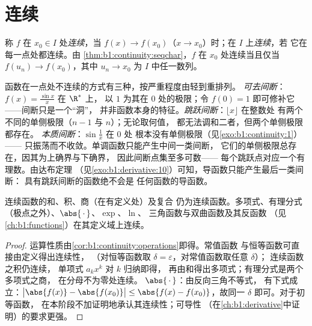 \section{连续}

\begin{definition}\label{def:b1:continuity:continuous}
称 $f$ 在 $x_0 \in I$ 处\emph{连续}，当 $f(x)
\to f(x_0)$（$x \to x_0$）时；在 $I$ 上\emph{连续}，若
它在每一点处都连续。由
\cref{thm:b1:continuity:seqchar}，$f$ 在 $x_0$ 处连续当且仅当
$f(u_n) \to f(x_0)$，其中 $u_n \to x_0$ 为 $I$ 中任一数列。
\end{definition}

\begin{example}[间断点的分类]\label{ex:b1:continuity:taxonomy}
函数在一点处不连续的方式有三种，按严重程度由轻到重排列。
\emph{可去间断}：$f(x) = \frac{\sin x}{x}$ 在 $\R^*$ 上，
以 $1$ 为其在 $0$ 处的极限；令 $f(0) = 1$ 即可修补它——间断只是一个“洞”，
并非函数本身的特征。\emph{跳跃间断}：$\lfloor x \rfloor$ 在整数处
有两个不同的单侧极限（$n - 1$ 与 $n$）；无论取何值，
都无法调和二者，但两个单侧极限都存在。
\emph{本质间断}：$\sin\frac1x$ 在 $0$ 处
根本没有单侧极限（见\cref{exo:b1:continuity:1}）——
只振荡而不收敛。单调函数只能产生中间一类间断，
它们的单侧极限总存在，因其为上确界与下确界，
因此间断点集至多可数——
每个跳跃点对应一个有理数。由达布定理
（见\cref{exo:b1:derivative:10}）可知，导函数只能产生最后一类间断：
具有跳跃间断的函数绝不会是
任何函数的导函数。
\end{example}

\begin{proposition}\label{prop:b1:continuity:algebra}
连续函数的和、积、商（在有定义处）及复合
仍为连续函数。多项式、有理分式
（极点之外）、$\abs{\,\cdot\,}$、$\exp$、$\ln$、
三角函数与双曲函数及其反函数
（见\cref{ch:b1:functions}）在其定义域上连续。
\end{proposition}

\begin{proof}
运算性质由\cref{cor:b1:continuity:operations}即得。常值函数
与恒等函数可直接由定义得出连续性，
（对恒等函数取 $\delta = \varepsilon$，对常值函数取任意 $\delta$）；
连续函数之积仍连续，
单项式 $a_k x^k$ 对 $k$ 归纳即得，
再由和得出多项式；有理分式是两个多项式之商，
在分母不为零处连续。
$\abs{\,\cdot\,}$：由反向三角不等式，
有下式成立：$\bigl|\abs{f(x)} - \abs{f(x_0)}\bigr| \leq \abs{f(x) -
f(x_0)}$，故同一 $\delta$ 即可。对于初等函数，
在本阶段不加证明地承认其连续性；可导性
（在\cref{ch:b1:derivative}中证明）的要求更强。
\end{proof}

